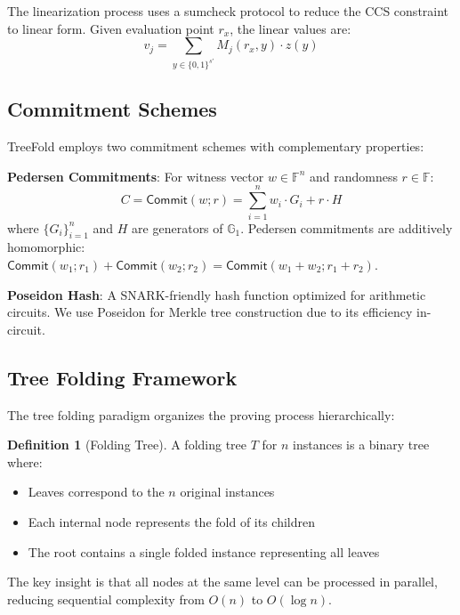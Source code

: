 \documentclass[11pt,a4paper]{article}
\theoremstyle{plain}
\theoremstyle{definition}
\newtheorem{definition}[theorem]{Definition}
\newcommand{\F}{\mathbb{F}}
\newcommand{\G}{\mathbb{G}}
\newcommand{\Com}{\mathsf{Commit}}
\begin{document}
The linearization process uses a sumcheck protocol to reduce the CCS constraint to linear form. Given evaluation point $r_x$, the linear values are:
\begin{equation}
v_j = \sum_{y \in \{0,1\}^{s'}} M_j(r_x, y) \cdot z(y)
\end{equation}

\subsection{Commitment Schemes}

TreeFold employs two commitment schemes with complementary properties:

\textbf{Pedersen Commitments}: For witness vector $w \in \F^n$ and randomness $r \in \F$:
\begin{equation}
C = \Com(w; r) = \sum_{i=1}^n w_i \cdot G_i + r \cdot H
\end{equation}
where $\{G_i\}_{i=1}^n$ and $H$ are generators of $\G_1$. Pedersen commitments are additively homomorphic: $\Com(w_1; r_1) + \Com(w_2; r_2) = \Com(w_1 + w_2; r_1 + r_2)$.

\textbf{Poseidon Hash}: A SNARK-friendly hash function optimized for arithmetic circuits. We use Poseidon for Merkle tree construction due to its efficiency in-circuit.

\subsection{Tree Folding Framework}

The tree folding paradigm organizes the proving process hierarchically:

\begin{definition}[Folding Tree]
A folding tree $T$ for $n$ instances is a binary tree where:
\begin{itemize}
\item Leaves correspond to the $n$ original instances
\item Each internal node represents the fold of its children
\item The root contains a single folded instance representing all leaves
\end{itemize}
\end{definition}

The key insight is that all nodes at the same level can be processed in parallel, reducing sequential complexity from $O(n)$ to $O(\log n)$.

\end{document}
